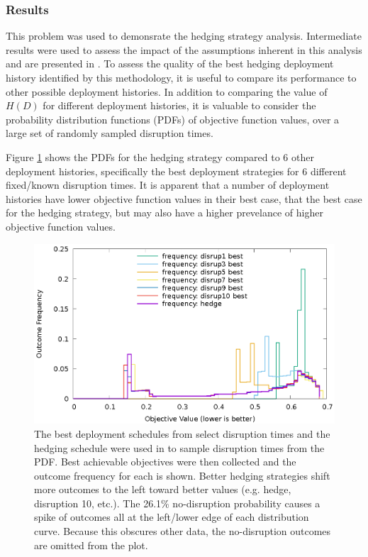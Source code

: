 \subsubsection{Results}

This problem was used to demonsrate the hedging strategy analysis.
Intermediate results were used to assess the impact of the assumptions
inherent in this analysis and are presented in \cite{rwc_dissertation}.  To
assess the quality of the best hedging deployment history identified by this
methodology, it is useful to compare its performance to other possible
deployment histories.  In addition to comparing the value of $H(D)$ for
different deployment histories, it is valuable to consider the probability
distribution functions (PDFs) of objective function values, over a large set
of randomly sampled disruption times.


Figure \ref{fig:exp3-outcome-dists} shows the PDFs for the hedging strategy
compared to 6 other deployment histories, specifically the best deployment
strategies for 6 different fixed/known disruption times.  It is apparent that
a number of deployment histories have lower objective function values in their
best case, that the best case for the hedging strategy, but may also have a
higher prevelance of higher objective function values.

\begin{figure}[!htb]
    \centering
    \includegraphics[width=1.0\columnwidth]{dists.eps}
    \caption[Experiment 3: Outcome Distributions]{
        The best deployment schedules from select disruption times and the
        hedging schedule were used in to sample disruption times from the PDF.
        Best achievable objectives were then collected and the outcome
        frequency for each is shown.  Better hedging strategies shift more
        outcomes to the left toward better values (e.g. hedge, disruption 10,
        etc.).  The 26.1\% no-disruption probability causes a spike of
        outcomes all at the left/lower edge of each distribution curve.
        Because this obscures other data, the no-disruption outcomes are
        omitted from the plot.
    }
    \label{fig:exp3-outcome-dists}
\end{figure}


